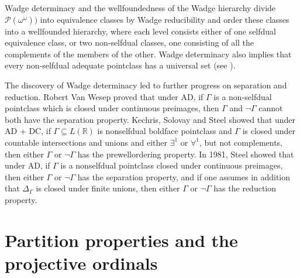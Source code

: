 \documentclass{book}%
\def\underTilde#1{{\baselineskip=0pt\vtop{\hbox{$#1$}\hbox{$\sim$}}}{}}
\begin{document}
Wadge determinacy and the wellfoundedness of the Wadge hierarchy
divide $\mathcal{P}(\omega^{\omega}))$ into equivalence
classes by Wadge reducibility and order these classes into a wellfounded
hierarchy, where each level
consists either of one selfdual equivalence class, or two non-selfdual classes,
one consisting of all the complements of the members of the other.
Wadge determinacy also implies that every non-selfdual adequate
pointclass has a universal set (see \cite[p.~162]{VanWesep:1978Wadge}).

The discovery of Wadge determinacy led to further progress on separation
and reduction. Robert Van Wesep
 proved that under AD,
if $\Gamma$ is a non-selfdual pointclass which is closed under continuous preimages, then $\Gamma$ and $\neg\Gamma$ cannot both have the
separation property.
Kechris, Solovay and Steel  showed that under AD +
DC, if $\Gamma \subseteq L(\mathbb{R})$ is nonselfdual boldface pointclass and $\Gamma$ is
closed under countable intersections and unions and either $\exists^{1}$ or $\forall^{1}$, but not complements,
then either $\Gamma$ or $\neg\Gamma$ has the prewellordering property.
In 1981, Steel  showed that under AD, if $\Gamma$ is a
nonselfdual pointclass closed under continuous preimages, then either $\Gamma$ or
$\neg\Gamma$ has the separation property, and if one assumes in
addition that $\Delta_{\Gamma}$ is closed under finite unions, then
either $\Gamma$ or $\neg\Gamma$ has the reduction property.



\section{Partition properties and the projective ordinals}\label{ppdsec}
\end{document}
